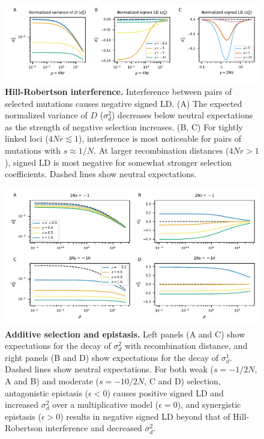 \documentclass[]{article}
\begin{document}
\begin{figure}[tb!]
    \centering
    \includegraphics{../figures/hill_robertson}
    \caption{
        \textbf{Hill-Robertson interference.}
        Interference between pairs of selected mutations causes negative
        signed LD.
        (A) The expected normalized variance of $D$ (\(\sigma_d^2\))
        decreases below neutral expectations
        as the strength of negative selection increases.
        (B, C) For tightly linked loci (\(4Nr \lesssim 1\)), interference is most
        noticeable for pairs of mutations with \(s \approx 1/N\).
        At larger recombination distances (\(4Nr > 1\)), signed LD is most
        negative for somewhat stronger selection coefficients.
        Dashed lines show neutral expectations.
    }
    \label{fig:HillRobertson}
\end{figure}

\begin{figure}[tb!]
    \centering
    \includegraphics{../figures/epistasis_prediction}
    \caption{
        \textbf{Additive selection and epistasis.}
        Left panels (A and C) show expectations for the decay of
        \(\sigma_d^2\) with recombination
        distance, and right panels (B and D) show expectations for the
        decay of \(\sigma_d^1\). Dashed lines
        show neutral expectations.
        For both weak (\(s=-1/2N\), A and B) and moderate
        (\(s=-10/2N\), C and D) selection,
        antagonistic epistasis (\(\epsilon < 0\))
        causes positive signed LD and increased $\sigma_d^2$ over
        a multiplicative model (\(\epsilon = 0\)),
        and synergistic epistasis (\(\epsilon > 0\)) results in negative signed
        LD beyond that of Hill-Robertson interference and decreased \(\sigma_d^2\).
    }
    \label{fig:epistasis}
\end{figure}
\end{document}
